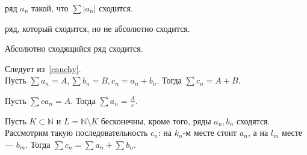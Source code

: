 \documentclass[12pt,a4paper]{article}
\begin{document}
 ряд $a_n$ такой, что $\sum|a_n|$ сходится.

 ряд, который сходится, но не абсолютно сходится.

\lemma Абсолютно сходящийся ряд сходится.

\proof Следует из~\ref{cauchy}.\QEDA\\

\lemma Пусть $\sum a_n=A,\sum b_n=B,c_n=a_n+b_n$. Тогда $\sum c_n=A+B$.

\lemma Пусть $\sum ca_n=A$. Тогда $\sum a_n=\frac{A}{c}$.

\lemma Пусть $K\subset \mathbb N$ и $L=\mathbb N\setminus K$ бесконечны, кроме того, ряды $a_n,b_n$ сходятся. Рассмотрим такую последовательность $c_n$: на $k_n$-м месте стоит $a_n$, а на $l_m$ месте --- $b_m$. Тогда $\sum c_n=\sum a_n+\sum b_n$.
\end{document}

